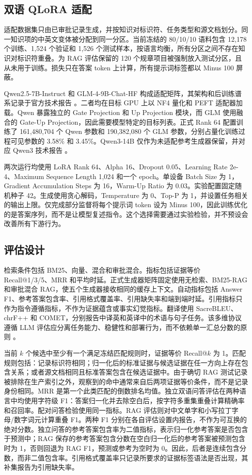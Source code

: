 \subsection{双语 QLoRA 适配}

适配数据集只由已审批记录生成，并按知识对标识符、任务类型和源文档划分。同一知识项的中英文变体被分配到同一分区。当前冻结的 80/10/10 语料包含 12,178 个训练、1,524 个验证和 1,526 个测试样本，按语言均衡，所有分区之间不存在知识对标识符重叠。为 RAG 评估保留的 120 个规章项目被强制放入测试分区，且从未用于训练。损失只在答案 token 上计算，所有提示词标签都以 Minus 100 屏蔽。

Qwen2.5-7B-Instruct 和 GLM-4-9B-Chat-HF 构成适配矩阵，其架构和后训练谱系记录于官方技术报告 \citep{qwen2024technical,glm2024chatglm}。二者均在目标 GPU 上以 NF4 量化和 PEFT 适配器加载。Qwen 暴露独立的 Gate Projection 和 Up Projection 模块，而 GLM 使用融合的 Gate-Up Projection，因此需要模型特定的目标列表。正式 Rank 64 配置训练了 161,480,704 个 Qwen 参数和 190,382,080 个 GLM 参数，分别占量化训练过程可见参数的 3.58\% 和 3.45\%。Qwen3-14B 仅作为未适配参考生成器保留，并对应 Qwen3 技术报告 \citep{qwen2025technical}。

两次运行均使用 LoRA Rank 64、Alpha 16、Dropout 0.05、Learning Rate 2e-4、Maximum Sequence Length 1,024 和一个 epoch。单设备 Batch Size 为 1，Gradient Accumulation Steps 为 16，Warm-Up Ratio 为 0.03。实验配置固定随机种子 42。生成使用贪心解码，Temperature 为 0、Top-P 为 1，并设置任务相关的输出上限。仅完成部分监督将每个提示词 token 设为 Minus 100，因此训练优化的是答案序列，而不是让模型复述指令。这个选择需要通过实验检验，并不预设会改善所有下游行为。

\subsection{评估设计}

检索条件包括 BM25、向量、混合和审批混合。指标包括证据等价 Recall@1/3/5、MRR 和平均时延。正式生成器矩阵固定使用无检索、BM25-RAG 和审批混合 RAG，使五个生成器接收相同的缓存上下文。自动指标包括 Answer F1、参考答案包含率、引用格式覆盖率、引用缺失率和端到端时延。引用指标只作为指令遵循指标，不作为证据蕴含或事实幻觉指标。翻译使用 SacreBLEU、chrF++ 和 COMET，分别报告中译英和英译中的术语与句子任务。该多维协议遵循 LLM 评估应分离任务能力、稳健性和部署行为，而不依赖单一汇总分数的原则 \citep{chang2024survey}。

当前 $k$ 个候选中至少有一个满足冻结匹配规则时，证据等价 Recall@$k$ 为 1。匹配规则包括：记录标识符相同；归一化后的标准证据与候选证据在任一方向上存在包含关系；或者源文档相同且标准答案包含在候选证据中。由于确切 RAG 测试记录被排除在生产索引之外，观察到的命中通常来自后两项证据等价条件，而不是记录身份相同。MRR 是第一个此类匹配的倒数排名均值。独立双语问答评估在两种语言中均使用字符级 F1：答案归一化并去除空白后，按字符多重集重叠计算精确率和召回率。配对问答检验使用同一指标。RAG 评估则对中文单字和小写拉丁字母/数字词元计算重叠 F1。两种 F1 分别在各自评估设置内报告，不作为可互换的绝对分数。独立问答的参考答案包含率为二值指标，表示归一化参考答案是否包含于预测中；RAG 保存的参考答案包含分数在空白归一化后的参考答案被预测包含时为 1，否则回退为 RAG F1，预测或参考为空时为 0。因此，后者是连续包含分数，而非二值包含率。引用格式覆盖率只记录所要求的证据标签语法是否出现，其补集报告为引用缺失率。

